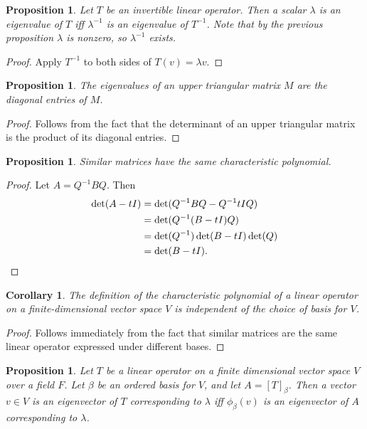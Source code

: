 \documentclass[12pt]{article}
\theoremstyle{plain}
\newtheorem{corollary}[theorem]{Corollary}
\newtheorem{proposition}[theorem]{Proposition}
\theoremstyle{definition}
\theoremstyle{remark}
\begin{document}
\begin{proposition}
Let $T$ be an invertible linear operator. Then a scalar $\lambda$ is an eigenvalue of $T$ iff $\lambda^{-1}$ is an eigenvalue of $T^{-1}$. Note that by the previous proposition $\lambda$ is nonzero, so $\lambda^{-1}$ exists.
\end{proposition}

\begin{proof}
Apply $T^{-1}$ to both sides of $T(v) = \lambda v$.
\end{proof}

\begin{proposition}
The eigenvalues of an upper triangular matrix $M$ are the diagonal entries of $M$.
\end{proposition}

\begin{proof}
Follows from the fact that the determinant of an upper triangular matrix is the product of its diagonal entries.
\end{proof}

\begin{proposition}
Similar matrices have the same characteristic polynomial.
\end{proposition}

\begin{proof}
Let $A = Q^{-1} B Q$. Then 
\begin{align*}
\det(A - tI) &= \det(Q^{-1} B Q - Q^{-1} tI Q) \\
&= \det(Q^{-1}(B - tI)Q) \\
&= \det(Q^{-1})\det(B - tI)\det(Q) \\
&= \det(B - tI).\qedhere
\end{align*}
\end{proof}

\begin{corollary}
The definition of the characteristic polynomial of a linear operator on a finite-dimensional vector space $V$ is independent of the choice of basis for $V$.
\end{corollary}

\begin{proof}
Follows immediately from the fact that similar matrices are the same linear operator expressed under different bases.
\end{proof}

\begin{proposition}
Let $T$ be a linear operator on a finite dimensional vector space $V$ over a field $F$. Let $\beta$ be an ordered basis for $V$, and let $A = [T]_\beta$. Then a vector $v \in V$ is an eigenvector of $T$ corresponding to $\lambda$ iff $\phi_\beta(v)$ is an eigenvector of $A$ corresponding to $\lambda$.
\end{proposition}
\end{document}
